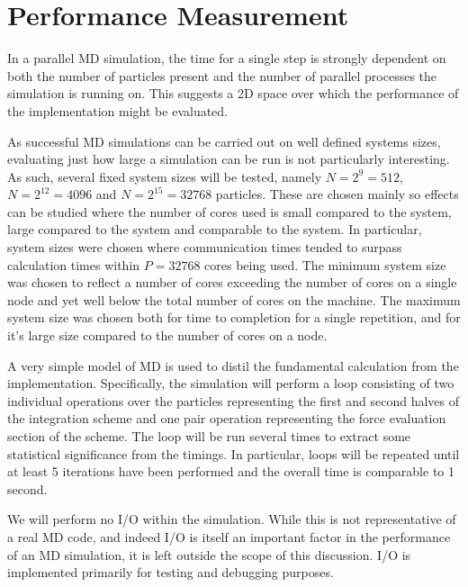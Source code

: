 


\section{Performance Measurement}

%
In a parallel MD simulation, the time for a single step is strongly dependent
on both the number of particles present and
the number of parallel processes the simulation is running on.
%
This suggests a 2D space over which the performance of the implementation
might be evaluated.

%
As successful MD simulations can be carried out on well defined
systems sizes, evaluating just how large a simulation can be run
is not particularly interesting.
%
As such, several fixed system sizes will be tested, namely
$N = 2^{9} = 512$,
$N = 2^{12} = 4096$ and
$N = 2^{15} = 32768$
particles.
%
These are chosen mainly so effects can be studied where the number of cores
used is small compared to the system, large compared to the system
and comparable to the system.
%
In particular, system sizes were chosen where communication times
tended to surpass calculation times within $P = 32768$ cores
being used.
%
The minimum system size was chosen to reflect a number of cores
exceeding the number of cores on a single \hector{} node and yet well
below the total number of cores on the machine.
%
The maximum system size was chosen both for time to completion for
a single repetition, and for it's large size compared to the number of
cores on a \hector{} node.

%
A very simple model of MD is used to distil the fundamental calculation
from the implementation.
%
Specifically, the simulation will perform a loop consisting of two
individual operations over the particles representing the first
and second halves of the \velocityverlet{} integration scheme and one
pair operation representing the force evaluation section of the scheme.
%
The loop will be run several times to extract some statistical significance
from the timings.
%
In particular, loops will be repeated until at least 5 iterations
have been performed and the overall time is comparable to 1 second.

%
We will perform no I/O within the simulation.
%
While this is not representative of a real MD code, and indeed I/O
is itself an important factor in the performance of an MD simulation,
it is left outside the scope of this discussion.
%
I/O is implemented primarily for testing and debugging purposes.

